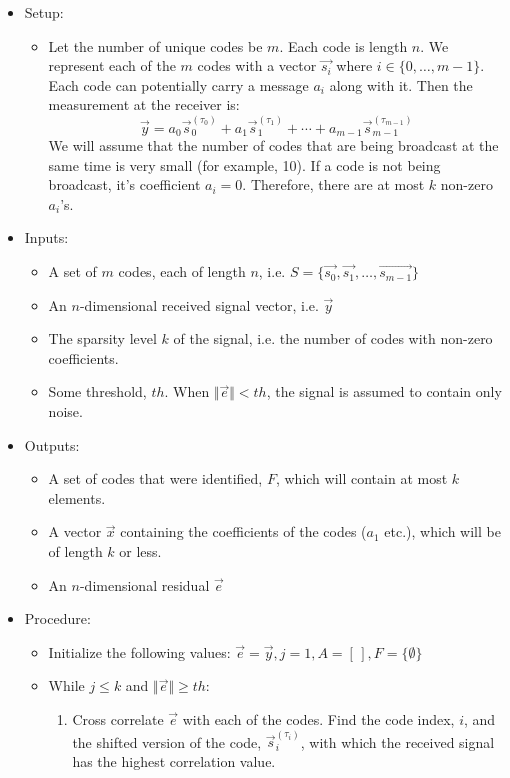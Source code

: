 \documentclass{article}
\begin{document}
\begin{itemize}
	\item Setup:
	\begin{itemize}
		\item Let the number of unique codes be $m$. Each code is length $n$. We represent each of the $m$ codes with a vector $\vec{s_i}$ where $i\in\{0,\dots,m-1\}$. Each code can potentially carry a message $a_i$ along with it. Then the measurement at the receiver is:
			$$\vec{y} = a_0\vec{s}_0^{(\tau_0)} + a_1\vec{s}_1^{(\tau_1)} + \cdots +
				a_{m-1}\vec{s}_{m-1}^{(\tau_{m-1})}$$
		We will assume that the number of codes that are being broadcast at the same time is very small (for example, 10). If a code is not being broadcast, it’s coefficient $a_i = 0$. Therefore, there are at most $k$ non-zero $a_i$’s.
	\end{itemize}
	\item Inputs:
	\begin{itemize}
		\item A set of $m$ codes, each of length $n$, i.e. $S = \{\vec{s_0}, \vec{s_1}, \dots, \vec{s_{m-1}}\}$
		\item An $n$-dimensional received signal vector, i.e. $\vec{y}$
		\item The sparsity level $k$ of the signal, i.e. the number of codes with non-zero coefficients.
		\item Some threshold, $th$. When $\Vert \vec{e}\Vert < th$, the signal is assumed to contain only noise.
	\end{itemize}
	\item Outputs:
	\begin{itemize}
		\item A set of codes that were identified, $F$, which will contain at most $k$ elements.
		\item A vector $\vec{x}$ containing the coefficients of the codes ($a_1$ etc.), which will be of length $k$ or less.
		\item An $n$-dimensional residual $\vec{e}$
	\end{itemize}
	\item Procedure:
	\begin{itemize}
		\item Initialize the following values:
		$\vec{e} = \vec{y}, j=1, A = [\,], F = \{\emptyset\}$
		\item While $j\leq k$ and $\Vert \vec{e}\Vert \geq th$:
		\begin{enumerate}
			\item Cross correlate $\vec{e}$ with each of the codes. Find the code index, $i$, and the shifted version of the code, $\vec{s}_i^{(\tau_i)}$, with which the received signal has the highest correlation value.

\end{enumerate}
\end{itemize}
\end{itemize}
\end{document}
